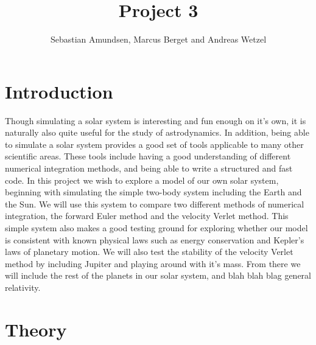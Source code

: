 \documentclass{article}
\begin{document}
\title{Project 3}
\author{Sebastian Amundsen, Marcus Berget and Andreas Wetzel}

\maketitle

\begin{abstract}

\end{abstract}

\begin{multicols}{2}

\section{Introduction}

Though simulating a solar system is interesting and fun enough on it's own, it is naturally also quite useful for the study of astrodynamics. In addition, being able to simulate a solar system provides a good set of tools applicable to many other scientific areas. These tools include having a good understanding of different numerical integration methods, and being able to write a structured and fast code. In this project we wish to explore a model of our own solar system, beginning with simulating the simple two-body system including the Earth and the Sun. We will use this system to compare two different methods of numerical integration, the forward Euler method and the velocity Verlet method. This simple system also makes a good testing ground for exploring whether our model is consistent with known physical laws such as energy conservation and Kepler's laws of planetary motion. We will also test the stability of the velocity Verlet method by including Jupiter and playing around with it's mass. From there we will include the rest of the planets in our solar system, and blah blah blag general relativity. 

\section{Theory}

\end{multicols}
\end{document}
